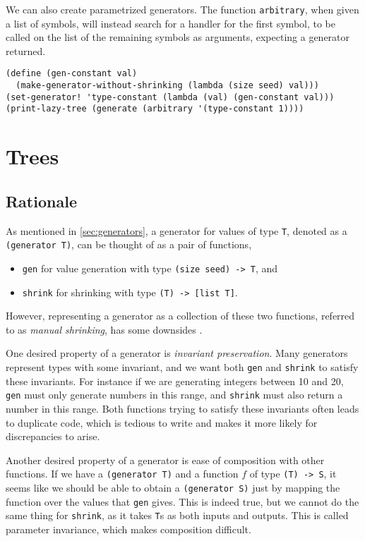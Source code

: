 \documentclass{scrartcl}
\begin{document}
We can also create parametrized generators. The function \verb|arbitrary|, when
given a list of symbols, will instead search for a handler for the first symbol,
to be called on the list of the remaining symbols as arguments, expecting a
generator returned.

\begin{verbatim}
(define (gen-constant val)
  (make-generator-without-shrinking (lambda (size seed) val)))
(set-generator! 'type-constant (lambda (val) (gen-constant val)))
(print-lazy-tree (generate (arbitrary '(type-constant 1))))
\end{verbatim}


\section{Trees}\label{sec:trees}
\subsection{Rationale}
As mentioned in \cref{sec:generators}, a generator for values of type \verb|T|,
denoted as a \verb|(generator T)|,
can be thought of as a pair of functions,
\begin{itemize}
  \item \verb|gen| for value generation
        with type \verb|(size seed) -> T|, and
  \item \verb|shrink| for shrinking with type \verb|(T) -> [list T]|.
\end{itemize}
However, representing a generator as a collection of these two functions,
referred to as \emph{manual shrinking}, has some downsides
\cite{integrated} \cite{integrated2}.

One desired property of a generator is \emph{invariant preservation}.
Many generators represent types with some invariant,
and we want both \verb|gen| and \verb|shrink| to satisfy these invariants.
For instance if we are generating integers between 10 and 20,
\verb|gen| must only generate numbers in this range,
and \verb|shrink| must also return a number in this range.
Both functions trying to satisfy these invariants
often leads to duplicate code, which is tedious to write and
makes it more likely for discrepancies to arise.

Another desired property of a generator is
ease of composition with other functions.
If we have a \verb|(generator T)| and a function \(f\) of type \verb|(T) -> S|,
it seems like we should be able to obtain a \verb|(generator S)| just by
mapping the function over the values that \verb|gen| gives.
This is indeed true, but we cannot do the same thing for \verb|shrink|,
as it takes \verb|T|s as both inputs and outputs.
This is called parameter invariance, which makes composition difficult.
\end{document}
